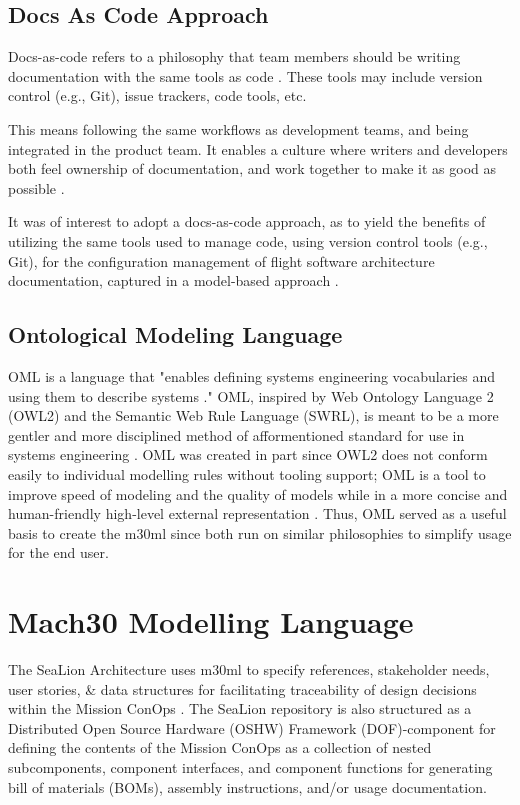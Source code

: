 \documentclass[conf]{new-aiaa}
\begin{document}
\subsection{Docs As Code Approach}

Docs-as-code refers to a philosophy that team members should be writing documentation with the same tools as code \cite{docs_as_code}.  These tools may include version control (e.g., Git), issue trackers, code tools, etc.

\begin{quoting}
    This means following the same workflows as development teams, and being integrated in the product team. It enables a culture where writers and developers both feel ownership of documentation, and work together to make it as good as possible \cite{docs_as_code}. 
\end{quoting}

It was of interest to adopt a docs-as-code approach, as to yield the benefits of utilizing the same tools used to manage code, using version control tools (e.g., Git), for the configuration management of flight software architecture documentation, captured in a model-based approach \cite{docs_as_code}.

\subsection{Ontological Modeling Language}

OML is a language that "enables defining systems engineering vocabularies and using them to describe systems \cite{oml_language}." OML, inspired by Web Ontology Language 2 (OWL2) and the Semantic Web Rule Language (SWRL), is meant to be a more gentler and more disciplined method of afformentioned standard for use in systems engineering \cite{oml_language}. OML was created in part since OWL2 does not conform easily to individual modelling rules without tooling support; OML is a tool to improve speed of modeling and the quality of models while in a more concise and human-friendly high-level external representation \cite{oml_origin_and_rationale}. Thus, OML served as a useful basis to create the m30ml since both run on similar philosophies to simplify usage for the end user.

\section{Mach30 Modelling Language}

The SeaLion Architecture uses m30ml to specify references, stakeholder needs, user stories, & data structures for facilitating traceability of design decisions within the Mission ConOps \cite{mach30_git}.  The SeaLion repository is also structured as a Distributed Open Source Hardware (OSHW) Framework (DOF)-component for defining the contents of the Mission ConOps as a collection of nested subcomponents, component interfaces, and component functions for generating bill of materials (BOMs), assembly instructions, and/or usage documentation.
\end{document}
